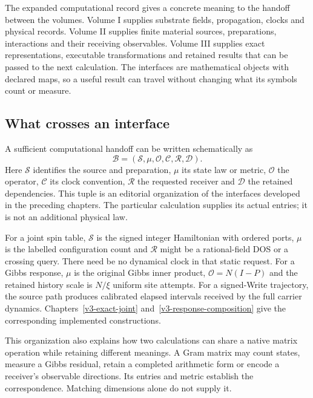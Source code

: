 \label{v3-connections-final}

The expanded computational record gives a concrete meaning to the handoff between the volumes. Volume I supplies substrate fields, propagation, clocks and physical records. Volume II supplies finite material sources, preparations, interactions and their receiving observables. Volume III supplies exact representations, executable transformations and retained results that can be passed to the next calculation. The interfaces are mathematical objects with declared maps, so a useful result can travel without changing what its symbols count or measure.

\subsection{What crosses an interface}

A sufficient computational handoff can be written schematically as
\begin{equation}
 \mathcal B=(\mathcal S,\mu,\mathcal O,\mathcal C,\mathcal R,\mathcal D).
\end{equation}
Here $\mathcal S$ identifies the source and preparation, $\mu$ its state law or metric, $\mathcal O$ the operator, $\mathcal C$ its clock convention, $\mathcal R$ the requested receiver and $\mathcal D$ the retained dependencies. This tuple is an editorial organization of the interfaces developed in the preceding chapters. The particular calculation supplies its actual entries; it is not an additional physical law.

For a joint spin table, $\mathcal S$ is the signed integer Hamiltonian with ordered ports, $\mu$ is the labelled configuration count and $\mathcal R$ might be a rational-field DOS or a crossing query. There need be no dynamical clock in that static request. For a Gibbs response, $\mu$ is the original Gibbs inner product, $\mathcal O=N(I-P)$ and the retained history scale is $N/\xi$ uniform site attempts. For a signed-Write trajectory, the source path produces calibrated elapsed intervals received by the full carrier dynamics. Chapters~\ref{v3-exact-joint} and~\ref{v3-response-composition} give the corresponding implemented constructions.

This organization also explains how two calculations can share a native matrix operation while retaining different meanings. A Gram matrix may count states, measure a Gibbs residual, retain a completed arithmetic form or encode a receiver's observable directions. Its entries and metric establish the correspondence. Matching dimensions alone do not supply it.

